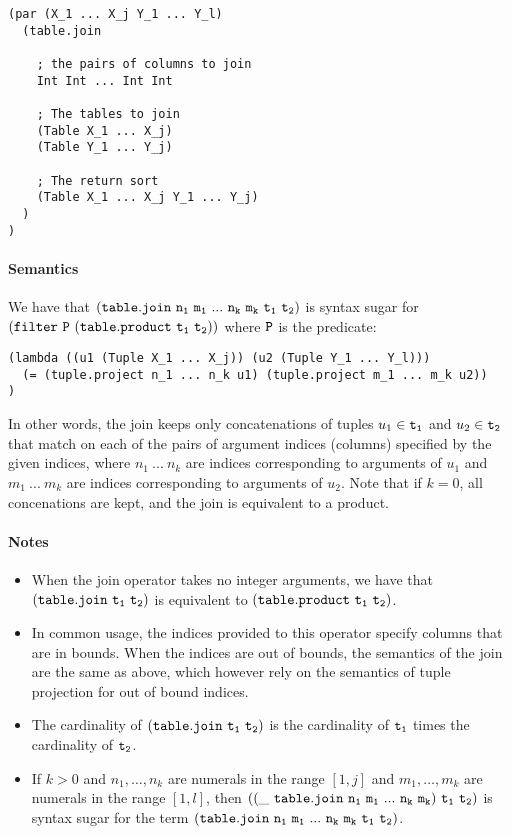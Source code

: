 \documentclass[english,a4paper,10pt]{article}
\begin{document}
\begin{verbatim}
(par (X_1 ... X_j Y_1 ... Y_l)
  (table.join
    
    ; the pairs of columns to join
    Int Int ... Int Int
  
    ; The tables to join
    (Table X_1 ... X_j)
    (Table Y_1 ... Y_j)
    
    ; The return sort
    (Table X_1 ... X_j Y_1 ... Y_j)
  )
)
\end{verbatim}

\paragraph{Semantics}
We have that $\syntax{(table.join\ n_1\ m_1\ ...\ n_k\ m_k\ t_1\ t_2)}$
is syntax sugar for $\syntax{(filter\ P\ (table.product\ t_1\ t_2))}$ where ${\tt P}$ is
the predicate:
\begin{verbatim}
(lambda ((u1 (Tuple X_1 ... X_j)) (u2 (Tuple Y_1 ... Y_l)))
  (= (tuple.project n_1 ... n_k u1) (tuple.project m_1 ... m_k u2))
)
\end{verbatim}
In other words,
the join keeps only concatenations of tuples $u_1 \in {\tt t_1}$ and
$u_2 \in {\tt t_2}$ 
that match on each of the pairs of argument indices (columns) specified by
the given indices,
where $n_1\ ...\ n_k$ are indices corresponding to arguments of $u_1$
and $m_1\ ...\ m_k$ are indices corresponding to arguments of $u_2$.
Note that if $k=0$, all concenations are kept, and the join is
equivalent to a product.

\paragraph{Notes}
\begin{itemize}
\item
When the join operator takes no integer arguments,
we have that ${\tt (table.join\ t_1\ t_2)}$
is equivalent to $\syntax{(table.product\ t_1\ t_2)}$.
\item
In common usage,
the indices provided to this operator specify columns that are in bounds.
When the indices are out of bounds,
the semantics of the join are the same as above, 
which however rely on the semantics of tuple projection for out of bound indices.
\item 
The cardinality of ${\tt (table.join\ t_1\ t_2)}$
is the cardinality of ${\tt t_1}$ times the cardinality of ${\tt t_2}$.
\item
If $k>0$ and $n_1, \ldots, n_k$ are numerals in the range $[1, j]$ 
and $m_1, \ldots, m_k$ are numerals in the range $[1, l]$, then
$\syntax{((\_\ table.join\ n_1\ m_1\ ...\ n_k\ m_k)\ t_1\ t_2)}$
is syntax sugar for the term
$\syntax{(table.join\ n_1\ m_1\ ...\ n_k\ m_k\ t_1\ t_2)}$.
\end{itemize}
\end{document}
